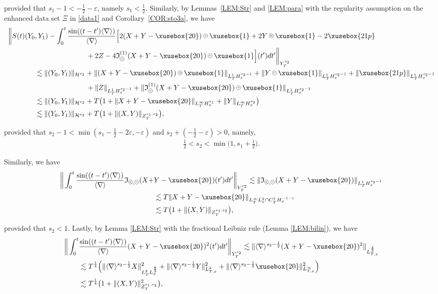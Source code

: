 \documentclass[%
11pt,  reqno]{amsart}
\def\<#1>{\xusebox{#1}}
\newcommand{\pe}{\mathbin{\scaleobj{0.7}{\tikz \draw (0,0) node[shape=circle,draw,inner sep=0pt,minimum size=8.5pt] {\scriptsize  $=$};}}}
\newcommand{\pl}{\mathbin{\scaleobj{0.7}{\tikz \draw (0,0) node[shape=circle,draw,inner sep=0pt,minimum size=8.5pt] {\scriptsize $<$};}}}
\newcommand{\pg}{\mathbin{\scaleobj{0.7}{\tikz \draw (0,0) node[shape=circle,draw,inner sep=0pt,minimum size=8.5pt] {\scriptsize $>$};}}}
\newcommand{\1}{\hspace{0.2mm}\text{I}\hspace{0.2mm}}
\newcommand{\noi}{\noindent}
\newcommand{\nb}{\nabla}
\newcommand{\eps}{\varepsilon}
\newcommand{\les}{\lesssim}
\newcommand{\jb}[1]
{\langle #1 \rangle}
\renewcommand{\H}{\mathcal{H}}
\newcommand{\If}{\mathfrak{I}}
\numberwithin{equation}{section}
\numberwithin{theorem}{section}
\begin{document}
\noi
provided that $s_1 - 1 < -\frac 12-\eps$, namely $s_1 < \frac 12$.
Similarly, 
by Lemmas~\ref{LEM:Str} and \ref{LEM:para}
with the regularity assumption on the enhanced data set
 $\Xi$ in \eqref{data1} and Corollary~\ref{COR:sto3a}, 
we have
\begin{align}
\bigg\| S(t)(Y_0 & , Y_1)  -  \int_0^t   \frac{\sin((t-t')\jb{\nb})}{\jb{\nb} }
\Big[ 2(X+Y-\<20>)\pg \<1> + 2  Y\pe \<1> - 2 \<21p> \notag\\
& \hphantom{XXXXXXXX}
 + 2Z
-4 \If_{\pl}^{(1)}(X + Y - \<20>)\pe \<1>\Big](t') dt' \bigg\|_{Y^{s_2}_T}\notag\\
& \les 
\| (Y_0, Y_1) \|_{\H^{s_2}}
+ 
 \|(X+Y-\<20>)\pg \<1>\|_{L^1_T H^{s_2 -1 }_x} +  
\| Y\pe \<1>\|_{L^1_T H^{s_2 -1 }_x} 
+ \| \<21p>\|_{L^1_T H^{s_2 -1 }_x} \notag\\ 
& \hphantom{XXXXXXXX}
+ \|Z\|_{L^1_T H^{s_2-1}_z}
+ \| \If_{\pl}^{(1)}(X + Y - \<20>)\pe \<1>\|_{L^1_T H^{s_2 -1 }_x}
\notag\\
& \les 
 \| (Y_0, Y_1) \|_{\H^{s_2}}
+  T\big( 1 + \|X+Y-\<20>\|_{L^\infty_T H^{s_1 }_x} +  
\| Y\|_{L^\infty_T H^{s_2  }_x} \big) \notag\\ 
& \les 
 \| (Y_0, Y_1) \|_{\H^{s_2}}
+ T \big( 1 + \|(X, Y)\|_{Z^{s_1, s_2}_T} \big), 
\label{M2}
\end{align}


\noi
provided that
$s_2 - 1 < \min(s_1 - \frac 12-2\eps, -\eps)$ and $s_2 + (-\frac 12-\eps) > 0$,
namely, 
\begin{align*}
\tfrac 12 < s_2 < \min\big(1, s_1 +\tfrac 12\big).
\end{align*}


\noi
Similarly, we have
\begin{align}
\bigg\|  \int_0^t   \frac{\sin((t-t')\jb{\nb})}{\jb{\nb}}    \If_{\pl, \pe}(X + & Y - \<20>)(t') dt'
 \bigg\|_{Y^{s_2}_T}
   \les  \|\If_{\pl, \pe}(X + Y - \<20>)\|_{L^1_T H^{s_2 -1 }_x}\notag\\
 &  \les T  \|X + Y - \<20>\|_{L^\infty_T L^2_x\cap C^1_TH^{-1-\eps}_x}\notag\\
& \les  T \big( 1 + \|(X, Y)\|_{Z^{s_1, s_2}_T} \big), 
\label{M3} 
\end{align}

\noi
provided that $s_2 < 1$.
Lastly, by Lemma \ref{LEM:Str}
with the fractional Leibniz rule (Lemma \ref{LEM:bilin}), we have
\begin{align}
\bigg\| \int_0^t &  \frac{\sin((t-t')\jb{\nb})}{\jb{\nb}} 
 (X+Y-\<20>)^2(t') dt'\bigg\|_{Y^{s_2}_T}
 \les \| \jb{\nb}^{s_2 - \frac 12}(X+Y-\<20>)^2\|_{L^\frac{4}{3}_{T, x}}\notag\\
& \les T^\frac{1}{4} 
\Big(\| \jb{\nb}^{s_2 - \frac 12}X\|_{L^8_T L^\frac{8}{3}_x}^2
+ \| \jb{\nb}^{s_2 - \frac 12}Y\|_{L^4_{T, x}}^2
+ \| \jb{\nb}^{s_2 - \frac 12}\<20>\|_{L^\infty_{T, x}}^2\Big)\notag\\
& \les T^\frac{1}{4} \big( 1 + \|(X, Y)\|_{Z^{s_1, s_2}_T}^2 \big), 
\label{M4}
\end{align}
\end{document}

